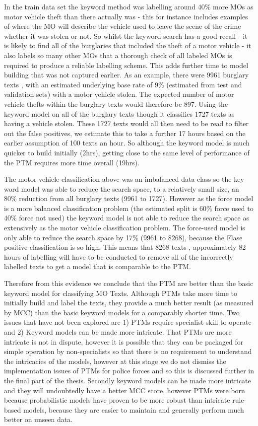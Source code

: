 In the train data set the keyword method was labelling around 40\% more MOs as motor vehicle theft than there actually was - this for instance includes examples of where the MO will describe the vehicle used to leave the scene of the crime whether it was stolen or not. So whilst the keyword search has a good recall - it is likely to find all of the burglaries that included the theft of a motor vehicle - it also labels so many other MOs that a thorough check of all labeled MOs is required to produce a reliable labelling scheme. This adds further time to model building that was not captured earlier. As an example, there were 9961 burglary texts , with an estimated underlying base rate of  9\% (estimated from test and validation sets) with a motor vehicle stolen. The expected number of motor vehicle thefts within the burglary texts would therefore be 897. Using the keyword model on all of the burglary texts though it classifies 1727 texts as having a vehicle stolen.  These 1727 texts would all then need to be read to filter out the false positives, we estimate this to take a further 17 hours based on the earlier assumption of 100 texts an hour. So although the keyword model is much quicker to build initially (2hrs), getting close to the same level of performance of the PTM requires more time overall (19hrs). 

The motor vehicle classification above  was an imbalanced data class so the key word model was able to reduce the search space, to a relatively small size, an 80\% reduction from all burglary texts (9961 to 1727). However as the force model is a more balanced classification problem (the estimated split is 60\% force used to 40\% force not used) the keyword model is not able to reduce the search space as extensively as the motor vehicle classification problem. The force-used model is only able to reduce the search space by 17\% (9961 to 8268), because the Flase positive classification is so high. This means that 8268 texts , approximately 82 hours of labelling will have to be conducted to remove all of the incorrectly labelled texts to get a model that is comparable to the PTM.

Therefore from this evidence we conclude that the PTM are better than the basic keyword model for classifying MO Texts. Although PTMs take more time to initially build and label the texts, they provide a much better result (as measured by MCC) than the basic keyword models for a comparably shorter time. Two issues that have not been explored are 1) PTMs require specialist skill to operate and 2) Keyword models can be made more intricate. That PTMs are more intricate is not in dispute, however it is possible that they can be packaged for simple operation by non-specialists so that there is no requirement to understand the intricacies of the models, however at this stage we do not dismiss the implementation issues of PTMs for police forces and so this is discussed further in the final part of the thesis. Secondly keyword models can be made more intricate and they will undoubtedly have a better MCC score, however PTMs were born because probabilistic models have proven to be more robust than intricate rule-based models, because they are easier to maintain and generally perform much better on unseen data.        

